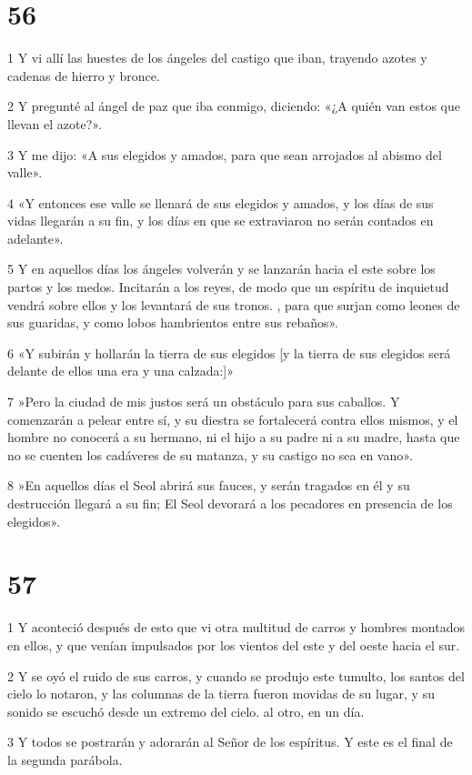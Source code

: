 \chapter{56}

\par 1 Y vi allí las huestes de los ángeles del castigo que iban, trayendo azotes y cadenas de hierro y bronce.
\par 2 Y pregunté al ángel de paz que iba conmigo, diciendo: «¿A quién van estos que llevan el azote?».
\par 3 Y me dijo: «A sus elegidos y amados, para que sean arrojados al abismo del valle».
\par 4 «Y entonces ese valle se llenará de sus elegidos y amados, y los días de sus vidas llegarán a su fin, y los días en que se extraviaron no serán contados en adelante».
\par 5 Y en aquellos días los ángeles volverán y se lanzarán hacia el este sobre los partos y los medos. Incitarán a los reyes, de modo que un espíritu de inquietud vendrá sobre ellos y los levantará de sus tronos. , para que surjan como leones de sus guaridas, y como lobos hambrientos entre sus rebaños».
\par 6 «Y subirán y hollarán la tierra de sus elegidos [y la tierra de sus elegidos será delante de ellos una era y una calzada:]»
\par 7 »Pero la ciudad de mis justos será un obstáculo para sus caballos. Y comenzarán a pelear entre sí, y su diestra se fortalecerá contra ellos mismos, y el hombre no conocerá a su hermano, ni el hijo a su padre ni a su madre, hasta que no se cuenten los cadáveres de su matanza, y su castigo no sea en vano».
\par 8 »En aquellos días el Seol abrirá sus fauces, y serán tragados en él y su destrucción llegará a su fin; El Seol devorará a los pecadores en presencia de los elegidos».

\chapter{57}

\par 1 Y aconteció después de esto que vi otra multitud de carros y hombres montados en ellos, y que venían impulsados ​​por los vientos del este y del oeste hacia el sur.
\par 2 Y se oyó el ruido de sus carros, y cuando se produjo este tumulto, los santos del cielo lo notaron, y las columnas de la tierra fueron movidas de su lugar, y su sonido se escuchó desde un extremo del cielo. al otro, en un día.
\par 3 Y todos se postrarán y adorarán al Señor de los espíritus. Y este es el final de la segunda parábola.

